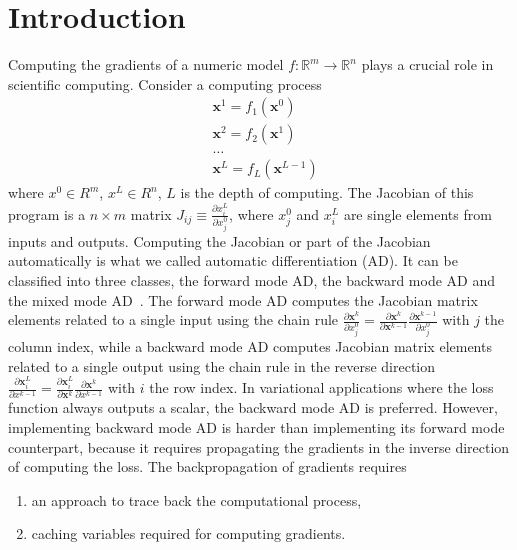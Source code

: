 \documentclass{article}
\newcommand{\<}{\langle}
\renewcommand{\>}{\rangle}
\newcommand{\vx}{{\mathbf{x}}}
\theoremstyle{definition}\newtheorem{definition}{\textit{Definition}}
\begin{document}
\section{Introduction}\label{sec:intro}
    Computing the gradients of a numeric model $f : \mathbb{R}^m \rightarrow \mathbb{R}^n$ plays a crucial role in scientific computing. Consider a computing process
\begin{align*}
    &\vx^1 = f_1(\vx^0)\\
    &\vx^2 = f_2(\vx^1)\\
    &\ldots\\
    &\vx^L = f_L(\vx^{L-1})
\end{align*}
where $x^0\in R^m$, $x^L\in R^n$, $L$ is the depth of computing.
The Jacobian of this program is a $n\times m$ matrix $J_{ij} \equiv \frac{\partial x^L_i}{\partial x_j^0}$, where $x_j^0$ and $x_i^L$ are single elements from inputs and outputs.
Computing the Jacobian or part of the Jacobian automatically is what we called automatic differentiation (AD). It can be classified into three classes, the forward mode AD, the backward mode AD and the mixed mode AD~\cite{Hascoet2013}.
    The forward mode AD computes the Jacobian matrix elements related to a single input using the chain rule $\frac{\partial \vx^k}{\partial x^0_j} = \frac{\partial \vx^k}{\partial \vx^{k-1}}\frac{\partial \vx^{k-1}}{\partial x^0_j}$ with $j$ the column index, while a backward mode AD computes Jacobian matrix elements related to a single output using the chain rule in the reverse direction $\frac{\partial \vx^L_i}{\partial x^{k-1}} = \frac{\partial \vx^L_i}{\partial \vx^{k}}\frac{\partial \vx^{k}}{\partial x^{k-1}}$ with $i$ the row index.
    In variational applications where the loss function always outputs a scalar, the backward mode AD is preferred.
However, implementing backward mode AD is harder than implementing its forward mode counterpart, because it requires propagating the gradients in the inverse direction of computing the loss. The backpropagation of gradients requires
\begin{enumerate}
    \item an approach to trace back the computational process,
    \item caching variables required for computing gradients.
\end{enumerate}
\end{document}
